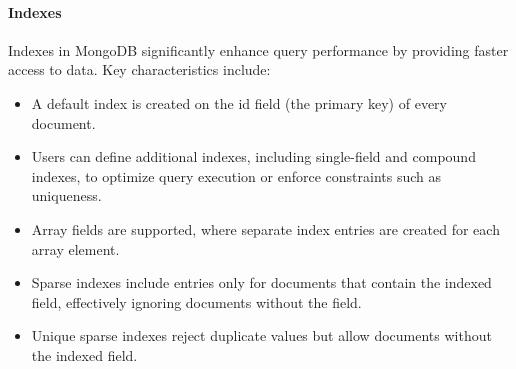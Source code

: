 \paragraph*{Indexes}
Indexes in MongoDB significantly enhance query performance by providing faster access to data. 
Key characteristics include:
\begin{itemize} 
    \item A default index is created on the id field (the primary key) of every document. 
    \item Users can define additional indexes, including single-field and compound indexes, to optimize query execution or enforce constraints such as uniqueness. 
    \item Array fields are supported, where separate index entries are created for each array element. 
    \item Sparse indexes include entries only for documents that contain the indexed field, effectively ignoring documents without the field. 
    \item Unique sparse indexes reject duplicate values but allow documents without the indexed field. 
\end{itemize}

